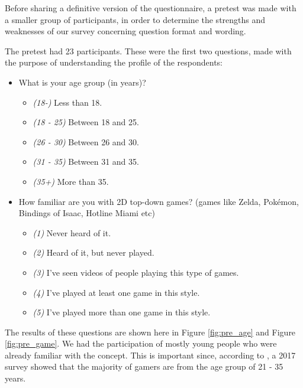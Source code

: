Before sharing a definitive version of the questionnaire, a pretest was made with a smaller group of participants, in order to determine the strengths and weaknesses of our survey concerning question format and wording.

The pretest had 23 participants. These were the first two questions, made with the purpose of understanding the profile of the respondents:
\begin{itemize}
    \item What is your age group (in years)?
    \begin{itemize}
        \item \emph{(18-)} Less than 18.
        \item \emph{(18 - 25)} Between 18 and 25.
        \item \emph{(26 - 30)} Between 26 and 30.
        \item \emph{(31 - 35)} Between 31 and 35.
        \item \emph{(35+)} More than 35.
    \end{itemize}
    \item How familiar are you with 2D top-down games? (games like Zelda, Pokémon, Bindings of Isaac, Hotline Miami etc)
    \begin{itemize}
        \item \emph{(1)} Never heard of it.
        \item \emph{(2)} Heard of it, but never played.
        \item \emph{(3)} I've seen videos of people playing this type of games.
        \item \emph{(4)} I've played at least one game in this style.
        \item \emph{(5)} I've played more than one game in this style.
    \end{itemize}
\end{itemize}

The results of these questions are shown here in Figure \ref{fig:pre_age} and Figure \ref{fig:pre_game}. We had the participation of mostly young people who were already familiar with the concept. This is important since, according to \textcite{statista:2017}, a 2017 survey showed that the majority of gamers are from the age group of 21 - 35 years.

